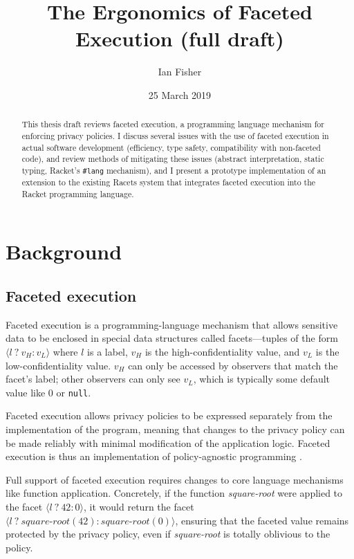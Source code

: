 \documentclass{article}
\title{The Ergonomics of Faceted Execution (full draft)}
\author{Ian Fisher}
\date{25 March 2019}
\begin{document}
\maketitle

\begin{abstract}
	This thesis draft reviews faceted execution, a programming language mechanism for enforcing privacy policies. I discuss several issues with the use of faceted execution in actual software development (efficiency, type safety, compatibility with non-faceted code), and review methods of mitigating these issues (abstract interpretation, static typing, Racket's \texttt{\#lang} mechanism), and I present a prototype implementation of an extension to the existing Racets system \cite{racets} that integrates faceted execution into the Racket programming language.
\end{abstract}

\tableofcontents



\section{Background}
\subsection{Faceted execution\label{sec:facets}}
Faceted execution is a programming-language mechanism that allows sensitive data to be enclosed in special data structures called facets---tuples of the form $\langle l\ ?\ v_H : v_L \rangle$ where $l$ is a label, $v_H$ is the high-confidentiality value, and $v_L$ is the low-confidentiality value. $v_H$ can only be accessed by observers that match the facet's label; other observers can only see $v_L$, which is typically some default value like $0$ or \texttt{null}.

Faceted execution allows privacy policies to be expressed separately from the implementation of the program, meaning that changes to the privacy policy can be made reliably with minimal modification of the application logic. Faceted execution is thus an implementation of policy-agnostic programming \cite{faceted}.

Full support of faceted execution requires changes to core language mechanisms like function application. Concretely, if the function \textit{square-root} were applied to the facet $\langle l \ ?\ 42 : 0 \rangle$, it would return the facet $\langle l \ ?\ \textit{square-root}(42) : \textit{square-root}(0) \rangle$, ensuring that the faceted value remains protected by the privacy policy, even if \textit{square-root} is totally oblivious to the policy.
\end{document}

